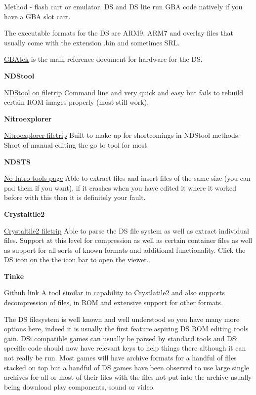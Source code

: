 \documentclass[
]{book}
\begin{document}
Method - flash cart or emulator. DS and DS lite run GBA code natively if you have a GBA slot cart.

The executable formats for the DS are ARM9, ARM7 and overlay files that usually come with the extension .bin and sometimes SRL.

\href{http://problemkaputt.de/gbatek.htm}{GBAtek} is the main reference document for hardware for the DS.

\textbf{NDStool}

\href{http://filetrip.net/nds-downloads/utilities/download-nintendo-ds-rom-tool-ndstool-1501-f29352.html}{NDStool on filetrip} Command line and very quick and easy but fails to rebuild certain ROM images properly (most still work).

\textbf{Nitroexplorer}

\href{http://filetrip.net/nds-downloads/utilities/download-nitroexplorer-2b-f7301.html}{Nitroexplorer filetrip} Built to make up for shortcomings in NDStool methods. Short of manual editing the go to tool for most.

\textbf{NDSTS}

\href{http://www.no-intro.org/tools.htm}{No-Intro tools page} Able to extract files and insert files of the same size (you can pad them if you want), if it crashes when you have edited it where it worked before with this then it is definitely your fault.

\textbf{Crystaltile2}

\href{http://filetrip.net/nds-downloads/utilities/download-crystaltile2-20100906-f23649.html}{Crystaltile2 filetrip} Able to parse the DS file system as well as extract individual files. Support at this level for compression as well as certain container files as well as support for all sorts of known formats and additional functionality. Click the DS icon on the the icon bar to open the viewer.

\textbf{Tinke}

\href{https://github.com/pleonex/tinke/}{Github link} A tool similar in capability to Crystlatile2 and also supports decompression of files, in ROM and extensive support for other formats.

The DS filesystem is well known and well understood so you have many more options here, indeed it is usually the first feature aspiring DS ROM editing tools gain. DSi compatible games can usually be parsed by standard tools and DSi specific code should now have relevant keys to help things there although it can not really be run. Most games will have archive formats for a handful of files stacked on top but a handful of DS games have been observed to use large single archives for all or most of their files with the files not put into the archive usually being download play components, sound or video.
\end{document}
